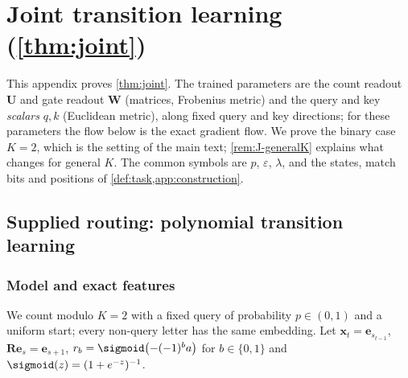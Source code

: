 \section{Joint transition learning (\texorpdfstring{\cref{thm:joint}}{Theorem 1(i)})}
\label{app:joint}

This appendix proves \cref{thm:joint}. The trained parameters are the count readout $\mathbf U$ and gate readout $\mathbf W$
(matrices, Frobenius metric) and the query and key \emph{scalars} $q,k$ (Euclidean metric), along fixed query and key
directions; for these parameters the flow below is the exact gradient flow.
We prove the binary case $K=2$, which is the setting of the main text; \cref{rem:J-generalK} explains what changes for general $K$.
The common symbols are $p$, $\varepsilon$, $\lambda$, and the states, match bits and positions of \cref{def:task,app:construction}.






\subsection{Supplied routing: polynomial transition learning}
\label{app:step-supplied-routing}



\subsubsection{Model and exact features}

We count modulo $K=2$ with a fixed query of probability $p\in(0,1)$ and a uniform start; every non-query letter has the same embedding. Let $\bm x_t=\bm e_{s_{t-1}}$, $\mathbf R\bm e_s=\bm e_{s+1}$, $r_b=\sigmoid\bigl(-(-1)^ba\bigr)$ for $b\in\{0,1\}$ and $\sigmoid(z)=(1+e^{-z})^{-1}$.


